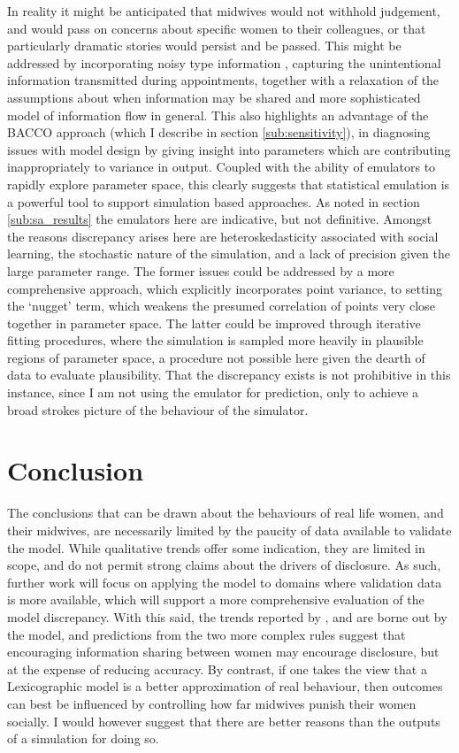 In reality it might be anticipated that midwives would not withhold judgement, and would pass on concerns about specific women to their colleagues, or that particularly dramatic stories would persist and be passed. This might be addressed by incorporating noisy type information \citep{Feltovich2002}, capturing the unintentional information transmitted during appointments, together with a relaxation of the assumptions about when information may be shared and more sophisticated model of information flow in general. This also highlights an advantage of the \ac{BACCO} approach (which I describe in section \ref{sub:sensitivity}), in diagnosing issues with model design by giving insight into parameters which are contributing inappropriately to variance in output. Coupled with the ability of emulators to rapidly explore parameter space, this clearly suggests that statistical emulation is a powerful tool to support simulation based approaches.
As noted in section \ref{sub:sa_results} the emulators here are indicative, but not definitive. Amongst the reasons discrepancy arises here are heteroskedasticity associated with social learning, the stochastic nature of the simulation, and a lack of precision given the large parameter range. The former issues could be addressed by a more comprehensive approach, which explicitly incorporates point variance, to setting the `nugget' term, which weakens the presumed correlation of points very close together in parameter space.  The latter could be improved through iterative fitting procedures, where the simulation is sampled more heavily in plausible regions of parameter space, a procedure not possible here given the dearth of data to evaluate plausibility. That the discrepancy exists is not prohibitive in this instance, since I am not using the emulator for prediction, only to achieve a broad strokes picture of the behaviour of the simulator.

\section{Conclusion}
\label{sec:conclusion}

The conclusions that can be drawn about the behaviours of real life women, and their midwives, are necessarily limited by the paucity of data available to validate the model. While qualitative trends offer some indication, they are limited in scope, and do not permit strong claims about the drivers of disclosure.  As such, further work will focus on applying the model to domains where validation data is more available, which will support a more comprehensive evaluation of the model discrepancy. 
With this said, the trends reported by \citet{Alvik2006}, and \citet{Phillips2007} are borne out by the model, and predictions from the two more complex rules suggest that encouraging information sharing between women may encourage disclosure, but at the expense of reducing accuracy. By contrast, if one takes the view that a Lexicographic model is a better approximation of real behaviour, then outcomes can best be influenced by controlling how far midwives punish their women socially. I would however suggest that there are better reasons than the outputs of a simulation for doing so.

